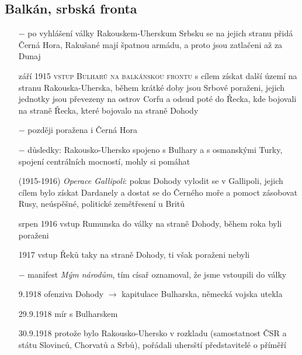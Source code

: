 \documentclass{article}
\begin{document}
\subsection*{Balkán, srbská fronta}
\begin{itemize}
    \vspace{-0.5em}
    \setlength\itemsep{0.15em}
    \item[$-$] po vyhlášení války Rakouskem-Uherskum Srbsku se na jejich stranu přidá Černá Hora, Rakušané mají špatnou armádu, a proto jsou zatlačeni až za Dunaj
    \item[září 1915] \textsc{vstup Bulharů na balkánskou frontu} s cílem získat další území na stranu Rakouska-Uherska, během krátké doby jsou Srbové poraženi, jejich jednotky jsou převezeny na ostrov Corfu a odsud poté do Řecka, kde bojovali na straně Řecka, které bojovalo na straně Dohody
    \item[$-$] později poražena i Černá Hora
    \item[$-$] důsledky: Rakousko-Uhersko  spojeno s Bulhary a s osmanskými Turky, spojení centrálních mocností, mohly si pomáhat
    \item[(1915-1916)] \textit{Operace Gallipoli}: pokus Dohody vylodit se v Gallipoli, jejich cílem bylo získat Dardanely a dostat se do Černého moře a pomoct zásobovat Rusy, neúspěšné, politické zemětřesení u Britů
    \item[srpen 1916] vstup Rumunska do války na straně Dohody, během roka byli poraženi
    \item[1917] vstup Řeků taky na straně Dohody, ti však poraženi nebyli
    \item[$-$] manifest \textit{Mým národům}, tím císař oznamoval, že jsme vstoupili do války
    \item[9.1918]  ofenziva Dohody $\rightarrow$ kapitulace Bulharska, německá vojska utekla
    \item[29.9.1918]  mír s Bulharskem
    \item[30.9.1918] protože bylo Rakousko-Uhersko v rozkladu (samostatnost ČSR a státu Slovinců, Chorvatů a Srbů), pořádali uhersští představitelé o příměří
\end{itemize}
\end{document}
